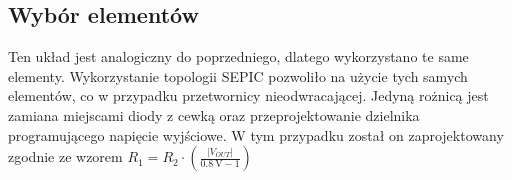 \documentclass[11pt]{article}
\begin{document}
\begin{figure}[H]
\begin{adjustbox}{width=1.2\textwidth,center}
{

            \label{fig:subfig2}
        }
    \end{adjustbox}
\end{figure}

\subsection{Wybór elementów}
Ten układ jest analogiczny do poprzedniego, dlatego wykorzystano te same elementy. Wykorzystanie topologii SEPIC pozwoliło na użycie tych samych elementów, co w przypadku przetwornicy nieodwracającej.
Jedyną rożnicą jest zamiana miejscami diody z cewką oraz przeprojektowanie dzielnika programującego napięcie wyjściowe. W tym przypadku został on zaprojektowany zgodnie ze wzorem $R_1 = R_2 \cdot \left(\frac{\lvert V_{OUT} \rvert}{\SI{0.8}{\V} - 1}\right)$
\end{document}
